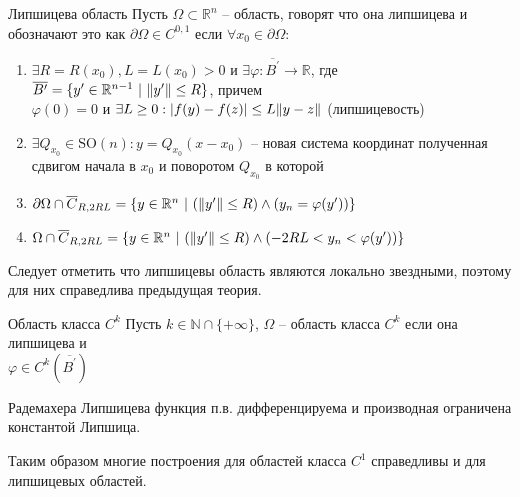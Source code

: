 \documentclass[12pt,a4paper]{article}
\newcommand{\Real}{\mathbb{R}}
\newcommand{\Natural}{\mathbb{N}}
\begin{document}
\begin{definition}{Липшицева область}{}
	Пусть $\Omega \subset \Real^n$ -- область, говорят что она липшицева и обозначают это как $\partial \Omega \in C^{0, 1}$ если $\forall x_0 \in \partial \Omega$:
	\begin{enumerate}
		\item $\exists R = R(x_0), L = L(x_0) > 0$ и $\exists \varphi : \overline{B^\prime} \to \Real$, где \\ $\overline{B^\prime}= \{ y^\prime \in \Real^{n-1} \ | \ \norm{y^\prime} \leq R \}$, причем \\ $\varphi (0) = 0$ и $\exists L \geq 0: |f(y) - f(z)| \leq L \norm{y - z}$ (липшицевость)
		\item $\exists Q_{x_0} \in \text{SO}(n): y = Q_{x_0} (x - x_0)$ -- новая система координат полученная сдвигом начала в $x_0$ и поворотом $Q_{x_0}$ в которой
		\item $\partial \Omega \cap \overline{C}_{R, 2RL} = \{ y \in \Real^n \ | \ (\norm{y^\prime} \leq R) \wedge (y_n = \varphi(y^\prime)) \}$
		\item $\Omega \cap \overline{C}_{R, 2RL} = \{ y \in \Real^n \ | \ (\norm{y^\prime} \leq R) \wedge (-2RL < y_n < \varphi(y^\prime)) \}$
	\end{enumerate}
\end{definition}
Следует отметить что липшицевы область являются локально звездными, поэтому для них справедлива предыдущая теория.

\begin{definition}{Область класса $C^k$}{}
	Пусть $k \in \Natural \cap \{+\infty\}$, $\Omega$ -- область класса $C^k$ если она липшицева и \\  $\varphi \in C^k (\overline{B^\prime})$
\end{definition}

\begin{theorem}{Радемахера}{}
	Липшицева функция п.в. дифференцируема и производная ограничена константой Липшица.
\end{theorem}
Таким образом многие построения для областей класса $C^1$ справедливы и для липшицевых областей.
\end{document}
